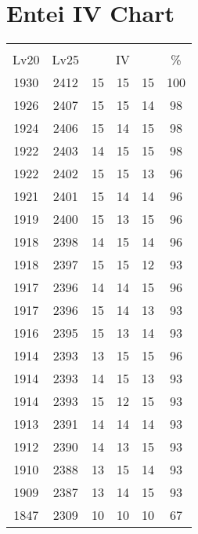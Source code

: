 \documentclass{article}%
\begin{document}
%
\normalsize%
\section{Entei IV Chart}%
\label{sec:Entei IV Chart}%
\renewcommand{\arraystretch}{1.5}%
\begin{tabular}{|c|c|c|c|c|c|}%
\hline%
\multicolumn{6}{|c|}{\textcolor{white}{ 
\linebreak{Entei}
}%
\cellcolor{black}}\\%
\multicolumn{1}{|c}{Lv20}&\multicolumn{1}{c|}{Lv25}&\multicolumn{3}{c|}{IV}&\multicolumn{1}{|c|}{\%}\\%
\hline%
\rowcolor{color100}%
1930&2412&15&15&15&100\\%
\hline%
\rowcolor{color98}%
1926&2407&15&15&14&98\\%
\hline%
\rowcolor{color98}%
1924&2406&15&14&15&98\\%
\hline%
\rowcolor{color98}%
1922&2403&14&15&15&98\\%
\hline%
\rowcolor{color96}%
1922&2402&15&15&13&96\\%
\hline%
\rowcolor{color96}%
1921&2401&15&14&14&96\\%
\hline%
\rowcolor{color96}%
1919&2400&15&13&15&96\\%
\hline%
\rowcolor{color96}%
1918&2398&14&15&14&96\\%
\hline%
\rowcolor{color93}%
1918&2397&15&15&12&93\\%
\hline%
\rowcolor{color96}%
1917&2396&14&14&15&96\\%
\hline%
\rowcolor{color93}%
1917&2396&15&14&13&93\\%
\hline%
\rowcolor{color93}%
1916&2395&15&13&14&93\\%
\hline%
\rowcolor{color96}%
1914&2393&13&15&15&96\\%
\hline%
\rowcolor{color93}%
1914&2393&14&15&13&93\\%
\hline%
\rowcolor{color93}%
1914&2393&15&12&15&93\\%
\hline%
\rowcolor{color93}%
1913&2391&14&14&14&93\\%
\hline%
\rowcolor{color93}%
1912&2390&14&13&15&93\\%
\hline%
\rowcolor{color93}%
1910&2388&13&15&14&93\\%
\hline%
\rowcolor{color93}%
1909&2387&13&14&15&93\\%
\hline%
\rowcolor{color91}%
1847&2309&10&10&10&67\\%
\end{tabular}

%
\end{document}
